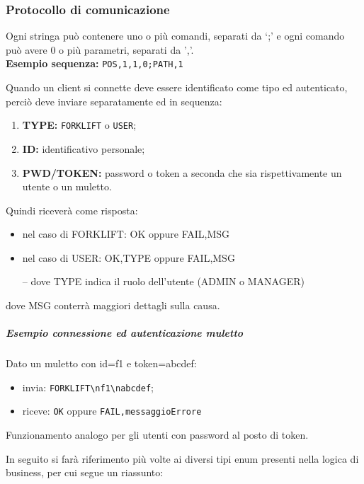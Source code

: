 \clearpage
\subsubsection{Protocollo di comunicazione}
\label{comm-protocol}

Ogni stringa può contenere uno o più comandi, separati da ‘;' e ogni comando può avere 0 o più parametri, separati da ',’. \\
\textbf{Esempio sequenza:} \texttt{POS,1,1,0;PATH,1}

    Quando un client si connette deve essere identificato come tipo ed autenticato, perciò deve inviare separatamente ed in sequenza:
    \begin{enumerate}
        \item \textbf{TYPE: }\texttt{FORKLIFT} o \texttt{USER};
        \item \textbf{ID: } identificativo personale;
        \item \textbf{PWD/TOKEN: } password o token a seconda che sia rispettivamente un utente o un muletto.
    \end{enumerate}
    Quindi riceverà come risposta:
    \begin{itemize}

        \item nel caso di FORKLIFT: OK oppure FAIL,MSG

        \item nel caso di USER: OK,TYPE oppure FAIL,MSG

        \subitem -- dove TYPE indica il ruolo dell’utente (ADMIN o MANAGER)
    \end{itemize}
    dove MSG conterrà maggiori dettagli sulla causa.

    \subparagraph{Esempio connessione ed autenticazione muletto}
        Dato un muletto con id=f1 e token=abcdef:
        \begin{itemize}
            \item invia: \texttt{FORKLIFT\textbackslash nf1\textbackslash nabcdef};

            \item riceve: \texttt{OK} oppure \texttt{FAIL,messaggioErrore}
        \end{itemize}


        Funzionamento analogo per gli utenti con password al posto di token.

    In seguito si farà riferimento più volte ai diversi tipi enum presenti nella logica di business, per cui segue un riassunto:


